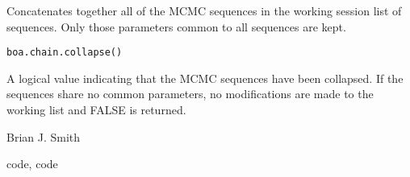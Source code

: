 \begin{Description}\relax
Concatenates together all of the MCMC sequences in the working session list
of sequences. Only those parameters common to all sequences are kept.
\end{Description}
\begin{Usage}
\begin{verbatim}
boa.chain.collapse()
\end{verbatim}
\end{Usage}
\begin{Value}
A logical value indicating that the MCMC sequences have been collapsed. If
the sequences share no common parameters, no modifications are made to the
working list and FALSE is returned.
\end{Value}
\begin{Author}\relax
Brian J. Smith
\end{Author}
\begin{SeeAlso}\relax
code{}, code{}
\end{SeeAlso}

